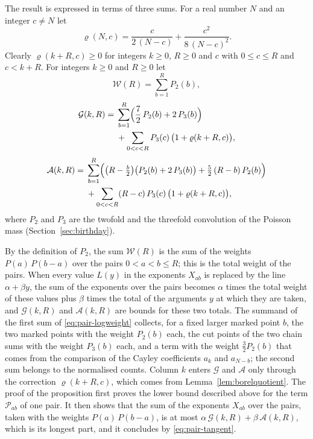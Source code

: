 \documentclass{amsart}
\theoremstyle{definition}
\theoremstyle{remark}
\numberwithin{equation}{section}
\begin{document}
The result is expressed in terms of three sums. For a real number $N$ and an
integer
$c\ne N$ let
\[
\varrho(N,c)=\frac{c}{2\,(N-c)}+\frac{c^2}{8\,(N-c)^2}.
\]
Clearly $\varrho(k+R,c)\ge0$ for integers $k\ge0$, $R\ge0$ and $c$ with
$0\le c\le R$ and $c<k+R$. For integers $k\ge0$ and $R\ge0$
let
\begin{equation}\label{eq:pair-weight}
\mathcal W(R)=\sum_{b=1}^{R}P_2(b),
\end{equation}
\begin{equation}\label{eq:pair-logweight}
\begin{split}
\mathcal G(k,R)={}&\sum_{b=1}^{R}\Bigl(\frac72\,P_2(b)+2\,P_3(b)\Bigr)\\
&+\sum_{0<c<R}P_3(c)\,\bigl(1+\varrho(k+R,c)\bigr),
\end{split}
\end{equation}
\begin{equation}\label{eq:pair-excess}
\begin{split}
\mathcal A(k,R)={}&\sum_{b=1}^{R}\Bigl(\bigl(R-\tfrac b2\bigr)
\bigl(P_2(b)+2\,P_3(b)\bigr)+\tfrac52\,(R-b)\,P_2(b)\Bigr)\\
&+\sum_{0<c<R}(R-c)\,P_3(c)\,\bigl(1+\varrho(k+R,c)\bigr),
\end{split}
\end{equation}
where $P_2$ and $P_3$ are the twofold and the threefold convolution of the
Poisson mass (Section~\ref{sec:birthday}).

By the definition of $P_2$, the sum $\mathcal W(R)$ is the sum of the
weights $P(a)\,P(b-a)$ over the pairs $0<a<b\le R$; this is the total
weight of the pairs. When every value $L(y)$ in the exponents $X_{ab}$ is
replaced
by the line $\alpha+\beta y$, the sum of the exponents over the pairs
becomes $\alpha$ times the total weight of these values plus $\beta$ times
the total of the arguments $y$ at which they are taken, and
$\mathcal G(k,R)$ and $\mathcal A(k,R)$ are bounds for these two totals.
The summand of the first sum of \eqref{eq:pair-logweight} collects, for a
fixed larger marked point $b$, the two marked points with the weight
$P_2(b)$ each, the cut points of the two chain sums with the weight
$P_3(b)$ each, and a term with the weight $\frac32P_2(b)$ that comes from
the comparison of the Cayley coefficients $a_k$ and $a_{N-b}$; the second
sum belongs to the normalised counts. Column $k$ enters $\mathcal G$ and
$\mathcal A$ only through the correction $\varrho(k+R,c)$, which comes from
Lemma~\ref{lem:borelquotient}. The proof of the proposition first
proves the lower bound described above for the term $\mathcal P_{ab}$ of
one pair. It then shows that the sum of the
exponents $X_{ab}$ over the pairs, taken with the weights $P(a)\,P(b-a)$,
is at most $\alpha\,\mathcal G(k,R)+\beta\,\mathcal A(k,R)$, which is its
longest part, and it concludes by \eqref{eq:pair-tangent}.
\end{document}

